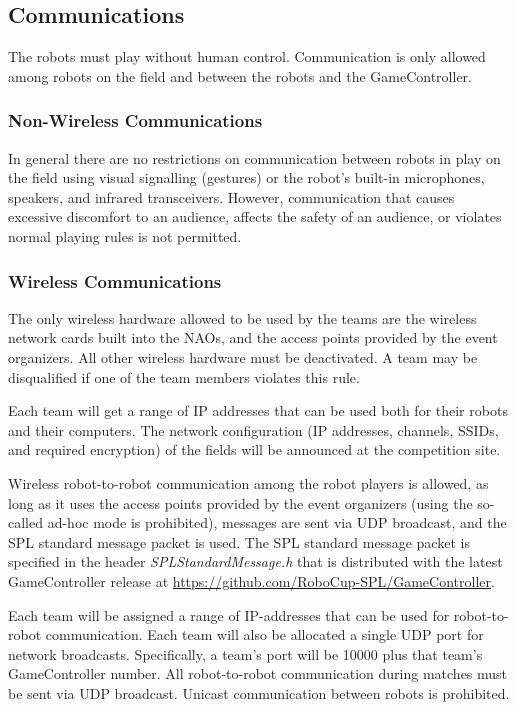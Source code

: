 \subsection{Communications}

The robots must play without human control. Communication is only allowed among robots on the field and between the robots and the GameController.

\subsubsection{Non-Wireless Communications}
\label{sec:acoustic}
In general there are no restrictions on communication between robots in play on the field using visual signalling (\eg gestures) or the robot's built-in microphones, speakers, and infrared transceivers. However, communication that causes excessive discomfort to an audience, affects the safety of an audience, or violates normal playing rules is not permitted.

\subsubsection{Wireless Communications}
\label{sec:wireless}
The only wireless hardware allowed to be used by the teams are the wireless network cards built into the NAOs, and the access points provided by the event organizers. All other wireless hardware must be deactivated. A team may be disqualified if one of the team members violates this rule.

Each team will get a range of IP addresses that can be used both for their robots and their computers. The network configuration (\eg IP addresses, channels, SSIDs, and required encryption) of the fields will be announced at the competition site.

Wireless robot-to-robot communication among the robot players is allowed, as long as it uses the access points provided by the event organizers (using the so-called ad-hoc mode is prohibited), messages are sent via UDP broadcast, and the SPL standard message packet is used. The SPL standard message packet is specified in the header \emph{SPLStandardMessage.h} that is distributed with the latest GameController release at \url{https://github.com/RoboCup-SPL/GameController}.

Each team will be assigned a range of IP-addresses that can be used for robot-to-robot communication. Each team will also be allocated a single UDP port for network broadcasts. Specifically, a team's port will be 10000 plus that team's GameController number. All robot-to-robot communication during matches must be sent via UDP broadcast. Unicast communication between robots is prohibited.

